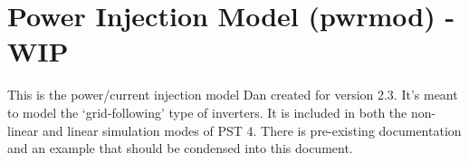 \section{Power Injection Model (pwrmod) - WIP}  
This is the power/current injection model Dan created for version 2.3.
It's meant to model the `grid-following' type of inverters.
It is included in both the non-linear and linear simulation modes of PST 4.
There is pre-existing documentation and an example that should be condensed into this document.